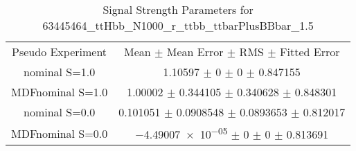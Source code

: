 \begin{table}
\centering
\caption{Signal Strength Parameters for 63445464\_ttHbb\_N1000\_r\_ttbb\_ttbarPlusBBbar\_1.5}
\begin{tabular}{cc}
\toprule
Pseudo Experiment & Mean $\pm$ Mean Error $\pm$ RMS $\pm$ Fitted Error\\
nominal S=1.0 & \num{1.10597} $\pm$ \num{0} $\pm$ \num{0} $\pm$ \num{0.847155}\\
MDFnominal S=1.0 & \num{1.00002} $\pm$ \num{0.344105} $\pm$ \num{0.340628} $\pm$ \num{0.848301}\\
nominal S=0.0 & \num{0.101051} $\pm$ \num{0.0908548} $\pm$ \num{0.0893653} $\pm$ \num{0.812017}\\
MDFnominal S=0.0 & \num{-4.49007e-05} $\pm$ \num{0} $\pm$ \num{0} $\pm$ \num{0.813691}\\
\bottomrule
\end{tabular}
\end{table}